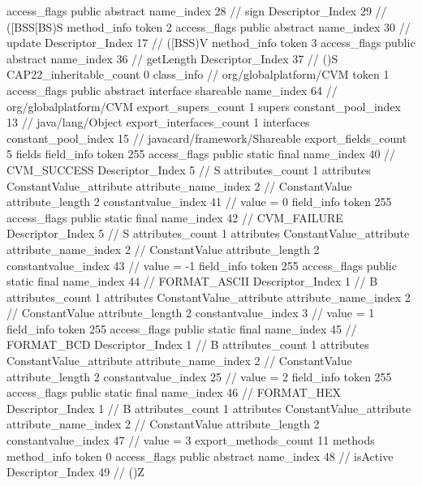 {{{{{					access_flags	public abstract
					name_index	28		// sign
					Descriptor_Index	29		// ([BSS[BS)S
				}
				method_info {
					token	2
					access_flags	public abstract
					name_index	30		// update
					Descriptor_Index	17		// ([BSS)V
				}
				method_info {
					token	3
					access_flags	public abstract
					name_index	36		// getLength
					Descriptor_Index	37		// ()S
				}
			}
			CAP22_inheritable_count	0
		}
		class_info {		// org/globalplatform/CVM
			token	1
			access_flags	public abstract interface shareable
			name_index	64		// org/globalplatform/CVM
			export_supers_count	1
			supers {
				constant_pool_index	13		// java/lang/Object
			}
			export_interfaces_count	1
			interfaces {
				constant_pool_index	15		// javacard/framework/Shareable
			}
			export_fields_count	5
			fields {
			field_info {
				token	255
				access_flags	public static final
				name_index	40		// CVM_SUCCESS
				Descriptor_Index	5		// S
				attributes_count	1
				attributes {
				ConstantValue_attribute {
					attribute_name_index	2		// ConstantValue
					attribute_length	2
					constantvalue_index	41		// value = 0
				}
				}
			}
			field_info {
				token	255
				access_flags	public static final
				name_index	42		// CVM_FAILURE
				Descriptor_Index	5		// S
				attributes_count	1
				attributes {
				ConstantValue_attribute {
					attribute_name_index	2		// ConstantValue
					attribute_length	2
					constantvalue_index	43		// value = -1
				}
				}
			}
			field_info {
				token	255
				access_flags	public static final
				name_index	44		// FORMAT_ASCII
				Descriptor_Index	1		// B
				attributes_count	1
				attributes {
				ConstantValue_attribute {
					attribute_name_index	2		// ConstantValue
					attribute_length	2
					constantvalue_index	3		// value = 1
				}
				}
			}
			field_info {
				token	255
				access_flags	public static final
				name_index	45		// FORMAT_BCD
				Descriptor_Index	1		// B
				attributes_count	1
				attributes {
				ConstantValue_attribute {
					attribute_name_index	2		// ConstantValue
					attribute_length	2
					constantvalue_index	25		// value = 2
				}
				}
			}
			field_info {
				token	255
				access_flags	public static final
				name_index	46		// FORMAT_HEX
				Descriptor_Index	1		// B
				attributes_count	1
				attributes {
				ConstantValue_attribute {
					attribute_name_index	2		// ConstantValue
					attribute_length	2
					constantvalue_index	47		// value = 3
				}
				}
			}
			}
			export_methods_count	11
			methods {
				method_info {
					token	0
					access_flags	public abstract
					name_index	48		// isActive
					Descriptor_Index	49		// ()Z
}}}}}
